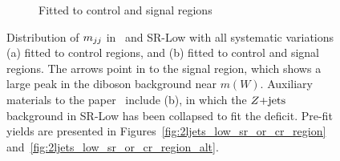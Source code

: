 \begin{figure}[tp]
\begin{subfigure}{0.48\textwidth}
\caption{Fitted to control and signal regions}
\label{fig:2ljets_low_crz_pre_post_post}
\end{subfigure}
\caption[
Distribution of $\mjj$ in CR-Z and SR-Low with all systematic variations
]{%
Distribution of $\mjj$ in \crz\ and SR-Low with all systematic variations
(a) fitted to control regions, and (b) fitted to control and signal regions.
The arrows point in to the signal region, which shows a large peak in the
diboson background near $m(W)$.
Auxiliary materials to the paper~\cite{atlas2022searches} include (b), in which
the $Z\mathrm{+jets}$ background in SR-Low has been collapsed to fit the deficit.
Pre-fit yields are presented in Figures~\ref{fig:2ljets_low_sr_or_cr_region}
and~\ref{fig:2ljets_low_sr_or_cr_region_alt}.
}
\label{fig:2ljets_low_crz_pre_post}
\end{figure}

